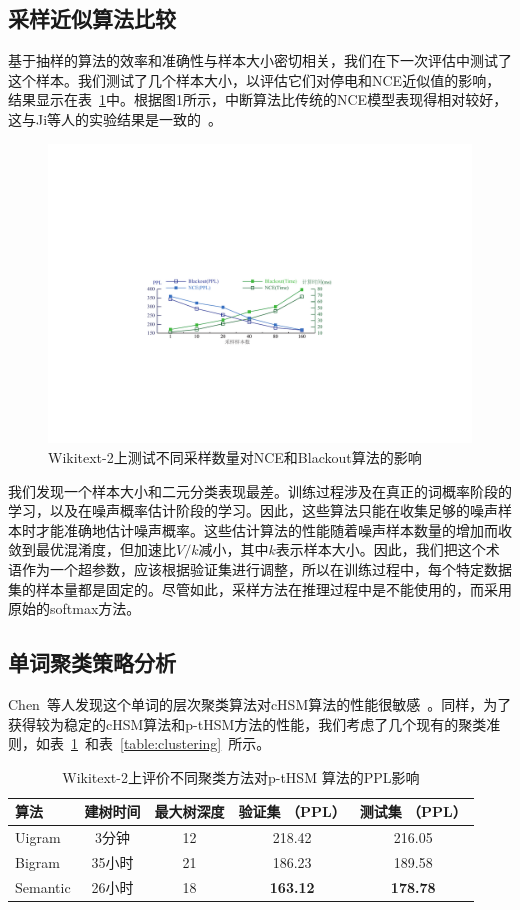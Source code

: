 \subsection{采样近似算法比较}

基于抽样的算法的效率和准确性与样本大小密切相关，我们在下一次评估中测试了这个样本。我们测试了几个样本大小，以评估它们对停电和NCE近似值的影响，结果显示在表~\ref{fig:blackout_nce}中。根据图1所示，中断算法比传统的NCE模型表现得相对较好，这与Ji等人的实验结果是一致的~\cite{DBLP:journals/iclr/JiVSAD15}。

\begin{figure}[!ht]
  \centering
  \includegraphics[width=.85\columnwidth]{./figures/nce_blackout.pdf}
  \caption{Wikitext-2上测试不同采样数量对NCE和Blackout算法的影响}\label{fig:blackout_nce}
\end{figure}

我们发现一个样本大小和二元分类表现最差。训练过程涉及在真正的词概率阶段的学习，以及在噪声概率估计阶段的学习。因此，这些算法只能在收集足够的噪声样本时才能准确地估计噪声概率。这些估计算法的性能随着噪声样本数量的增加而收敛到最优混淆度，但加速比$ V / k $减小，其中$ k $表示样本大小。因此，我们把这个术语作为一个超参数，应该根据验证集进行调整，所以在训练过程中，每个特定数据集的样本量都是固定的。尽管如此，采样方法在推理过程中是不能使用的，而采用原始的softmax方法。



\subsection{单词聚类策略分析}
Chen~等人发现这个单词的层次聚类算法对cHSM算法的性能很敏感~。同样，为了获得较为稳定的cHSM算法和p-tHSM方法的性能，我们考虑了几个现有的聚类准则，如表~\ref{table:p-thsm}~和表~\ref{table:clustering}~所示。
\begin{table}[!ht]
  \centering
   \caption{Wikitext-2上评价不同聚类方法对p-tHSM 算法的PPL影响\label{table:p-thsm}}
  \begin{tabular}{lcccc} \toprule
  算法  &建树时间&最大树深度 &验证集 （PPL） & 测试集 （PPL）  \\ \midrule
  Uigram  &3分钟&12 &218.42& 216.05     \\
  Bigram  &35小时&21& 186.23& 189.58\\
  Semantic &26小时 &18& \textbf{163.12} & \textbf{178.78}\\
\bottomrule
  \end{tabular}
\end{table}

